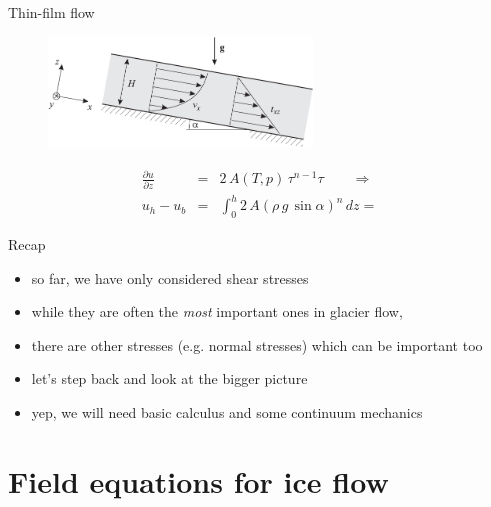 \documentclass[hide notes,intlimits]{beamer}
\begin{document}
\begin{frame}{Thin-film flow}
  \begin{figure}
    \includegraphics[width=7cm]{figures/fig_3_11}
  \end{figure}
  \begin{equation*}
    \begin{array}{ccl}
      \frac{\partial u}{\partial z}  & = &  2\,A(T,p)\,\tau^{n-1}\tau \qquad \Rightarrow \\[1em]
      u_{h} - u_{b} &  = & \int_{0}^{h} 2\,A\left(\rho\,g\,\sin{\alpha}\right)^{n}\,dz =
    \end{array}
  \end{equation*}
\end{frame}


\begin{frame}{Recap}
  \begin{itemize}
    \item so far, we have only considered shear stresses 
    \item while they are often the \emph{most} important ones in glacier flow,
    \item there are other stresses (e.g. normal stresses) which can be important too
    \item let's step back and look at the bigger picture
    \item yep, we will need basic calculus and some continuum mechanics
  \end{itemize}
\end{frame}


\section{Field equations for ice flow}
\end{document}
